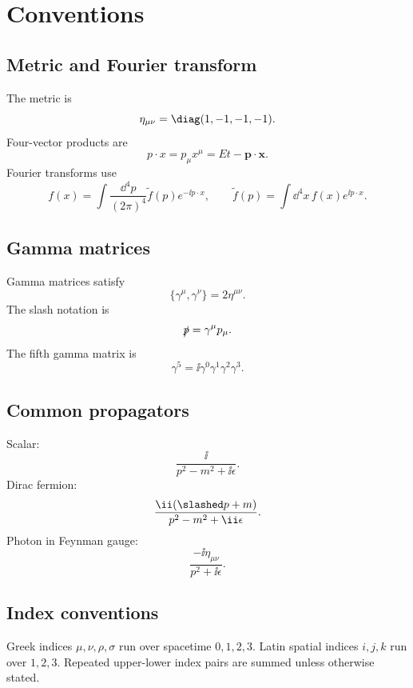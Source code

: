 \chapter{Conventions}

\section{Metric and Fourier transform}

The metric is
\[
  \eta_{\mu\nu}=\diag(1,-1,-1,-1).
\]
Four-vector products are
\[
  p\cdot x=p_\mu x^\mu=Et-\bm p\cdot\bm x.
\]
Fourier transforms use
\[
  f(x)=\int\frac{\dd^4p}{(2\pi)^4}\tilde f(p)e^{-\ii p\cdot x},
  \qquad
  \tilde f(p)=\int\dd^4x\,f(x)e^{\ii p\cdot x}.
\]

\section{Gamma matrices}

Gamma matrices satisfy
\[
  \{\gamma^\mu,\gamma^\nu\}=2\eta^{\mu\nu}.
\]
The slash notation is
\[
  \slashed p=\gamma^\mu p_\mu.
\]
The fifth gamma matrix is
\[
  \gamma^5=\ii\gamma^0\gamma^1\gamma^2\gamma^3.
\]

\section{Common propagators}

Scalar:
\[
  \frac{\ii}{p^2-m^2+\ii\epsilon}.
\]
Dirac fermion:
\[
  \frac{\ii(\slashed p+m)}{p^2-m^2+\ii\epsilon}.
\]
Photon in Feynman gauge:
\[
  \frac{-\ii\eta_{\mu\nu}}{p^2+\ii\epsilon}.
\]

\section{Index conventions}

Greek indices \(\mu,\nu,\rho,\sigma\) run over spacetime \(0,1,2,3\).  Latin spatial indices \(i,j,k\) run over \(1,2,3\).  Repeated upper-lower index pairs are summed unless otherwise stated.


